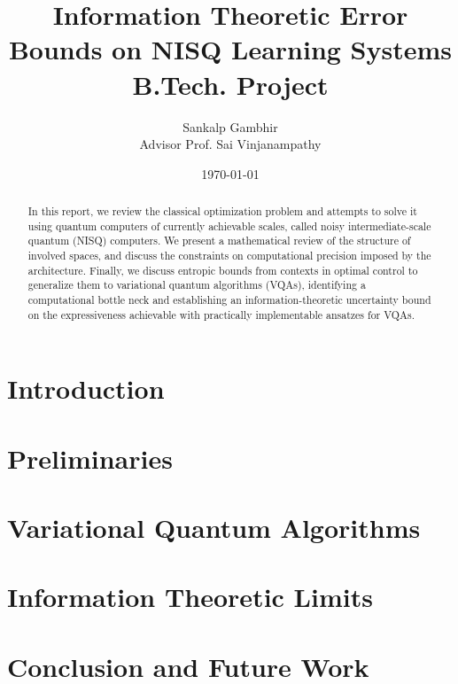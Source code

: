 \documentclass[
    paper=a4, 
    lang=en, 
    font=kpfonts,
    ptsize=12pt,
    titles=bf,
    hanging-titles=true,
    cleanlook, printdayoff, %
    final %
]
{skrapport}
\title{
    {\huge Information Theoretic Error Bounds on NISQ Learning Systems} \\
    {\large B.Tech. Project}
    }
\author[sgambhir@iitb.ac.in]{
    Sankalp Gambhir \\ 
    \vspace{1em}
        {
            \normalsize 
            \hspace{0.1em} 
            Advisor \hspace{0.5em}
            Prof. Sai Vinjanampathy
        }
    \vspace{-1.3em}
}
\date{\today}
\newcounter{notes}
\begin{document}
    \begin{titlepage}
        \maketitle
        \begin{abstract}
            In this report, we review the classical optimization problem and
            attempts to solve it using quantum computers of currently achievable
            scales, called noisy intermediate-scale quantum (NISQ) computers. We
            present a mathematical review of the structure of involved spaces,
            and discuss the constraints on computational precision imposed by
            the architecture. Finally, we discuss entropic bounds from contexts
            in optimal control to generalize them to variational quantum
            algorithms (VQAs), identifying a computational bottle neck and
            establishing an information-theoretic uncertainty bound on the
            expressiveness achievable with practically implementable ansatzes
            for VQAs.
        \end{abstract}

        \listofnotes
    \end{titlepage}

    \tableofcontents \pagebreak

    \section{Introduction}
        \label{sec:intro}
        
    
    \section{Preliminaries}
        \label{sec:prelim}
        

    \section{Variational Quantum Algorithms}
        \label{sec:vqa}
        
    
    \section{Information Theoretic Limits}
        \label{sec:infolimits}
        

    \section{Conclusion and Future Work}
        \label{sec:future}
        
\end{document}
